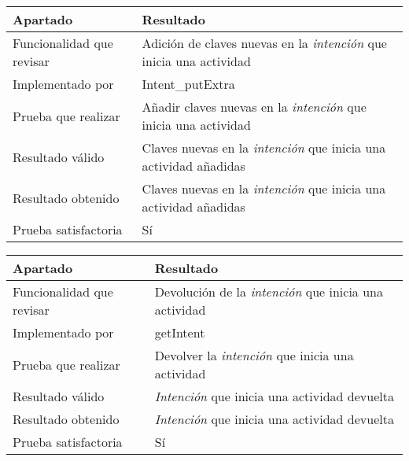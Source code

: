 \bigskip

\begin{center}
    \begin{tabulary}{0.8\textwidth}{L|L}
        \textbf{Apartado} & \textbf{Resultado} \\ \hline
        Funcionalidad que revisar & Adición de claves nuevas en la \textit{intención} que inicia una actividad \\
        Implementado por & Intent\_putExtra \\
        Prueba que realizar & Añadir claves nuevas en la \textit{intención} que inicia una actividad \\
        Resultado válido & Claves nuevas en la \textit{intención} que inicia una actividad añadidas \\
        Resultado obtenido & Claves nuevas en la \textit{intención} que inicia una actividad añadidas \\
        Prueba satisfactoria & Sí \\
    \end{tabulary}
\end{center}

\bigskip

\begin{center}
    \begin{tabulary}{0.8\textwidth}{L|L}
        \textbf{Apartado} & \textbf{Resultado} \\ \hline
        Funcionalidad que revisar & Devolución de la \textit{intención} que inicia una actividad \\
        Implementado por & getIntent \\
        Prueba que realizar & Devolver la \textit{intención} que inicia una actividad \\
        Resultado válido & \textit{Intención} que inicia una actividad devuelta \\
        Resultado obtenido & \textit{Intención} que inicia una actividad devuelta \\
        Prueba satisfactoria & Sí \\
    \end{tabulary}
\end{center}

\bigskip

